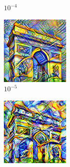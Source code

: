 \documentclass[12pt]{beamer}
\begin{document}
\begin{frame}
\begin{figure}[ht]
\begin{subfigure}[b]{0.25\textwidth}
                \caption{$10^{-4}$}
            \end{subfigure}
            \begin{subfigure}[b]{0.25\textwidth}
                \centering
                \includegraphics[width=\textwidth]{resources/gatys/weights/sun-trees-paris-10-5.png}
                \caption{$10^{-5}$}
            \end{subfigure}
            \hfill
            \begin{subfigure}[b]{0.25\textwidth}
                \centering
                \includegraphics[width=\textwidth]{resources/gatys/weights/sun-trees-paris-10-6.png}

\end{subfigure}
\end{figure}
\end{frame}
\end{document}

